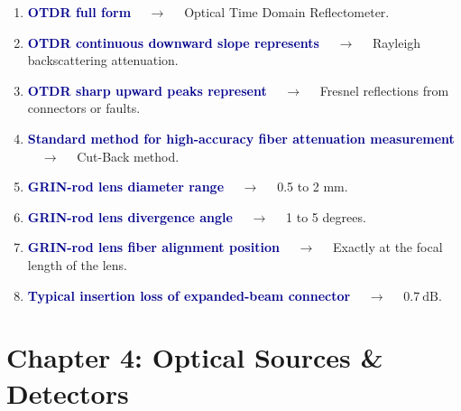 \documentclass[11pt,a4paper]{article}
\begin{document}
\begin{enumerate}[label=\arabic*., leftmargin=*, labelsep=0.8em, itemsep=0.35em, parsep=0.1em, topsep=0.2em]
  \item \textcolor{darkblue}{\textbf{OTDR full form}} $\quad\to\quad$ Optical Time Domain Reflectometer.
  \item \textcolor{darkblue}{\textbf{OTDR continuous downward slope represents}} $\quad\to\quad$ Rayleigh backscattering attenuation.
  \item \textcolor{darkblue}{\textbf{OTDR sharp upward peaks represent}} $\quad\to\quad$ Fresnel reflections from connectors or faults.
  \item \textcolor{darkblue}{\textbf{Standard method for high-accuracy fiber attenuation measurement}} $\quad\to\quad$ Cut-Back method.
  \item \textcolor{darkblue}{\textbf{GRIN-rod lens diameter range}} $\quad\to\quad$ 0.5 to 2 mm.
  \item \textcolor{darkblue}{\textbf{GRIN-rod lens divergence angle}} $\quad\to\quad$ 1 to 5 degrees.
  \item \textcolor{darkblue}{\textbf{GRIN-rod lens fiber alignment position}} $\quad\to\quad$ Exactly at the focal length of the lens.
  \item \textcolor{darkblue}{\textbf{Typical insertion loss of expanded-beam connector}} $\quad\to\quad$ $0.7\ \text{dB}$.
\end{enumerate}

\section*{Chapter 4: Optical Sources \& Detectors}
\end{document}
